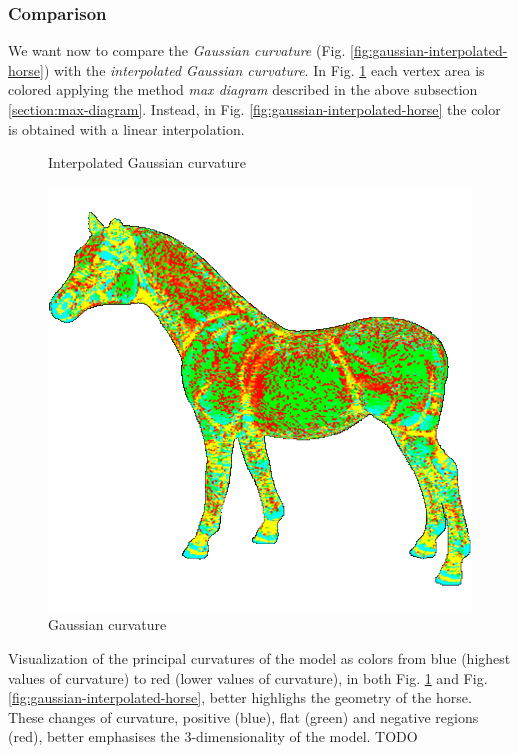 \subsubsection{Comparison}
We want now to compare the \textit{Gaussian curvature} (Fig. \ref{fig:gaussian-interpolated-horse}) with the \textit{interpolated Gaussian curvature}. In Fig. \ref{fig:gaussian-horse} each vertex area is colored applying the method \textit{max diagram} described in the above subsection \ref{section:max-diagram}. Instead, in Fig. \ref{fig:gaussian-interpolated-horse} the color is obtained with a linear interpolation.
\begin{figure}[!htb]
\centering
    \caption{Interpolated Gaussian curvature} \label{fig:gaussian-interpolated-horse}
  \endminipage\hfill
  \centering
    \includegraphics[width=\linewidth]{images/gaussian-horse.png}
    \caption{Gaussian curvature}\label{fig:gaussian-horse}
  \endminipage
  \end{figure}

Visualization of the principal curvatures of the model as colors from blue (highest values of curvature) to red (lower values of curvature), in both Fig. \ref{fig:gaussian-horse} and Fig. \ref{fig:gaussian-interpolated-horse}, better highlighs the geometry of the horse.
These changes of curvature, positive (blue), flat (green) and negative regions (red), better emphasises the 3-dimensionality of the model.
TODO
